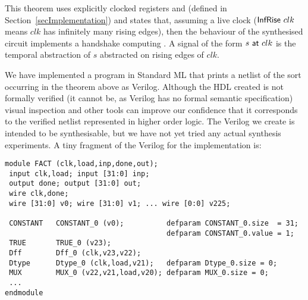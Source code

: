 This theorem uses explicitly clocked registers  and
 (defined in Section~\ref{secImplementation}) and states
that, assuming a live clock ($\mathsf{InfRise}~clk$ means $clk$
has infinitely many rising edges), then the behaviour of the
synthesised circuit implements a handshake computing
. A signal of the form $s~\mathsf{at}~clk$ is the temporal abstraction
of $s$ abstracted on rising edges of $clk$.

We have implemented a program in Standard ML that prints a netlist of
the sort occurring in the theorem above as Verilog. Although the HDL created is not
formally verified (it cannot be, as Verilog has no formal semantic
specification) visual inspection and other tools can improve our
confidence that it corresponds to the verified netlist
represented in higher order logic. The Verilog we create is intended
to be synthesisable, but we have not yet tried any actual synthesis
experiments. A tiny fragment of the Verilog for the 
implementation is:

\vspace*{-2mm}

{\baselineskip6pt\footnotesize\begin{verbatim}
module FACT (clk,load,inp,done,out);
 input clk,load; input [31:0] inp;
 output done; output [31:0] out;
 wire clk,done;
 wire [31:0] v0; wire [31:0] v1; ... wire [0:0] v225;

 CONSTANT   CONSTANT_0 (v0);          defparam CONSTANT_0.size  = 31;
                                      defparam CONSTANT_0.value = 1;
 TRUE       TRUE_0 (v23);
 Dff        Dff_0 (clk,v23,v22);
 Dtype      Dtype_0 (clk,load,v21);   defparam Dtype_0.size = 0;
 MUX        MUX_0 (v22,v21,load,v20); defparam MUX_0.size = 0;
 ...
endmodule
\end{verbatim}}

